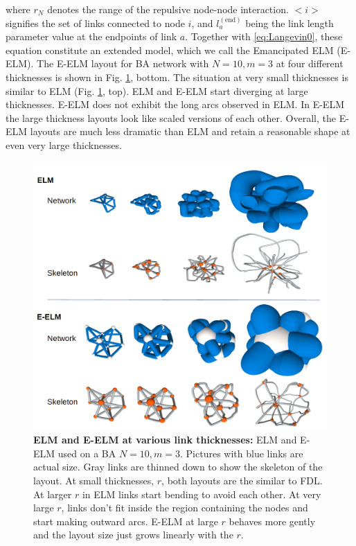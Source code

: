 \documentclass[nofootinbib,preprint,floatfix,endfloats]{revtex4} %
\begin{document}
where $r_N$ denotes the range of the repulsive node-node interaction. 
$<i>$ signifies the set of links connected to node $i$, and $l_a^\mathrm{(end)}$ being the link length parameter value at the endpoints of link $a$.
Together with \eqref{eq:Langevin0}, these equation constitute an extended model, which we call the Emancipated ELM (E-ELM). 
The E-ELM layout for BA network with $N=10, m=3$ at four different thicknesses is shown in  
Fig. \ref{fig:ELM}, bottom. The situation at very small thicknesses is similar to ELM (Fig. \ref{fig:ELM}, top). ELM and E-ELM start diverging at large thicknesses. E-ELM does not exhibit the long arcs observed in ELM. In E-ELM the large thickness layouts look like scaled versions of each other. Overall, the E-ELM layouts are much less dramatic than ELM and retain a reasonable shape at even very large thicknesses.
%
\begin{figure}
    \centering
    \includegraphics[width = .7\columnwidth]{fig-09-19/ELM-E-ELM.png}
    \caption{{\bf ELM and E-ELM at various link thicknesses:} ELM and E-ELM used on a BA $N=10, m=3$. Pictures with blue links are actual size. Gray links are thinned down to show the skeleton of the layout.  At small thicknesses, $r$, both layouts are the similar to FDL. At larger $r$ in ELM links start bending to avoid each other. At very large $r$, links don't fit inside the region containing the nodes and start making outward arcs. E-ELM at large $r$ behaves more gently and the layout size just grows linearly with the $r$.}
    \label{fig:ELM}
\end{figure}
\end{document}

